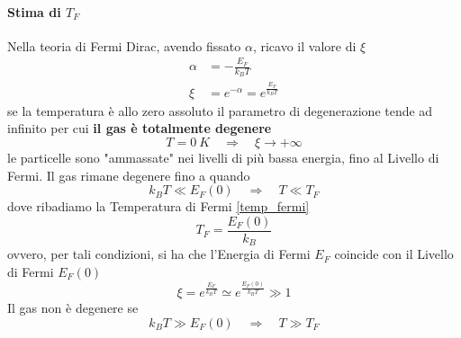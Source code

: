 \paragraph{Stima di $T_F$}
Nella teoria di Fermi Dirac, avendo fissato $\alpha$, ricavo il valore di $\xi$
\begin{equation}
\begin{split}
\alpha & = - \frac{E_F}{k_B T} \\
\xi & = e^{ -\alpha } = e^{ \frac{E_F}{k_B T} }
\end{split}
\end{equation}
se la temperatura è allo zero assoluto il parametro di degenerazione tende ad infinito per cui \textbf{il gas è totalmente degenere}
\begin{equation}
T=\SI{0}{K} \quad\Rightarrow\quad \xi \to + \infty
\end{equation}
le particelle sono "ammassate" nei livelli di più bassa energia, fino al Livello di Fermi.
Il gas rimane degenere fino a quando
\begin{equation}
k_B T \ll E_F(0) \quad\Rightarrow\quad T \ll T_F
\end{equation}
dove ribadiamo la Temperatura di Fermi \ref{temp_fermi}
$$T_F= \frac{E_F(0)}{k_B}$$
ovvero, per tali condizioni, si ha che l'Energia di Fermi $E_F$ coincide con il Livello di Fermi $E_F(0)$
\begin{equation}
\xi = e^{ \frac{E_F}{k_B T} } \simeq e^{ \frac{E_F(0)}{k_B T} } \gg 1
\end{equation}
Il gas non è degenere se
\begin{equation}
k_B T \gg E_F(0) \quad\Rightarrow\quad T \gg T_F
\end{equation}

